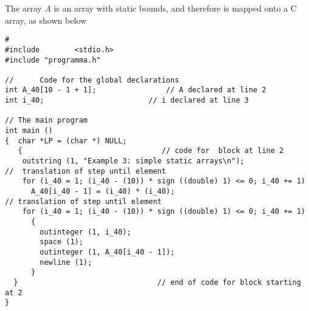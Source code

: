 \documentclass[11pt]{article}
\begin{document}
The array {\em A} is an array with static bounds, and therefore is mapped onto
a C array, as shown below
{\footnotesize
\begin{verbatim}
#
#include        <stdio.h>
#include "programma.h"

//      Code for the global declarations
int A_40[10 - 1 + 1];                // A declared at line 2
int i_40;                        // i declared at line 3

// The main program
int main ()
{  char *LP = (char *) NULL;
   {                                // code for  block at line 2 
    outstring (1, "Example 3: simple static arrays\n");
//  translation of step until element
    for (i_40 = 1; (i_40 - (10)) * sign ((double) 1) <= 0; i_40 += 1)
      A_40[i_40 - 1] = (i_40) * (i_40);
// translation of step until element
    for (i_40 = 1; (i_40 - (10)) * sign ((double) 1) <= 0; i_40 += 1)
      {
        outinteger (1, i_40);
        space (1);
        outinteger (1, A_40[i_40 - 1]);
        newline (1);
      }
  }                                // end of code for block starting at 2
}
\end{verbatim}
}
\end{document}
